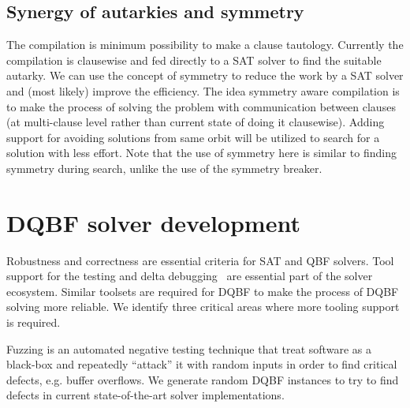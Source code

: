 \documentclass[conference]{IEEEtran}
\begin{document}

\subsection{Synergy of autarkies and symmetry}
The compilation is minimum possibility to make a clause tautology. 
%
Currently the compilation is clausewise and fed directly to a SAT solver to find the suitable autarky.
%
We can use the concept of symmetry to reduce the work by a SAT solver and (most likely) improve the efficiency.
%
The idea symmetry aware compilation is to make the process of solving the problem with communication between clauses (at multi-clause level rather than current state of doing it clausewise).
%
Adding support for avoiding solutions from same orbit will be utilized to search for a solution with less effort.
%
Note that the use of symmetry here is similar to finding symmetry during search, unlike the use of the symmetry breaker. 
 

\section{DQBF solver development}
\label{sec:dev}

Robustness and correctness are essential criteria for SAT and
QBF solvers.
%
Tool support for the testing and delta debugging~\cite{brummayer2010automated} are essential part of the solver ecosystem.
%
Similar toolsets are required for DQBF to make the process of DQBF solving more reliable.  
We identify three critical areas where more tooling support is required.

Fuzzing is an automated negative testing technique that treat software as a black-box and repeatedly “attack” it with random inputs in order to find critical defects, e.g. buffer overflows.
%
We generate random DQBF instances to try to find defects in current state-of-the-art solver implementations.
%
\end{document}
